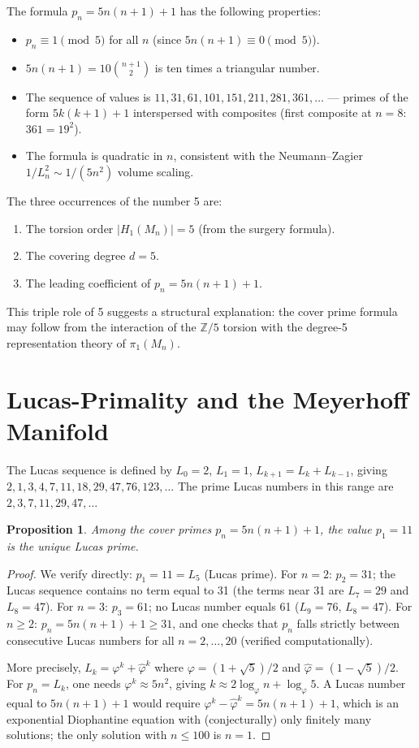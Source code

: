 \documentclass[11pt,a4paper]{article}
\newtheorem{proposition}[theorem]{Proposition}
\theoremstyle{definition}
\newcommand{\ZZ}{\mathbb{Z}}
\newcommand{\Zfive}{\ZZ/5}
\newcommand{\Mn}{M_n}
\newcommand{\vp}{\varphi}
\begin{document}
The formula $p_n = 5n(n+1)+1$ has the following properties:
\begin{itemize}
\item $p_n \equiv 1 \pmod{5}$ for all $n$
  (since $5n(n+1) \equiv 0 \pmod 5$).
\item $5n(n+1) = 10\binom{n+1}{2}$ is ten times a triangular number.
\item The sequence of values is $11, 31, 61, 101, 151, 211, 281,
  361, \ldots$ — primes of the form $5k(k+1)+1$
  interspersed with composites (first composite at $n=8$: $361=19^2$).
\item The formula is quadratic in $n$, consistent with the
  Neumann--Zagier $1/L_n^2 \sim 1/(5n^2)$ volume scaling.
\end{itemize}

The three occurrences of the number 5 are:
\begin{enumerate}
\item The torsion order $|H_1(\Mn)| = 5$ (from the surgery formula).
\item The covering degree $d=5$.
\item The leading coefficient of $p_n = 5n(n+1)+1$.
\end{enumerate}
This triple role of 5 suggests a structural explanation:
the cover prime formula may follow from the interaction of the
$\Zfive$ torsion with the degree-5 representation theory of
$\pi_1(\Mn)$.

\section{Lucas-Primality and the Meyerhoff Manifold}
\label{sec:lucas}

The Lucas sequence is defined by $L_0=2$, $L_1=1$,
$L_{k+1}=L_k+L_{k-1}$, giving
$2,1,3,4,7,11,18,29,47,76,123,\ldots$
The prime Lucas numbers in this range are $2,3,7,11,29,47,\ldots$

\begin{proposition}
Among the cover primes $p_n = 5n(n+1)+1$, the value $p_1 = 11$
is the unique Lucas prime.
\end{proposition}

\begin{proof}
We verify directly:
$p_1=11=L_5$ (Lucas prime).
For $n=2$: $p_2=31$; the Lucas sequence contains no term equal to 31
(the terms near 31 are $L_7=29$ and $L_8=47$).
For $n=3$: $p_3=61$; no Lucas number equals 61 ($L_9=76$, $L_8=47$).
For $n \geq 2$: $p_n = 5n(n+1)+1 \geq 31$, and one checks that
$p_n$ falls strictly between consecutive Lucas numbers for all
$n=2,\ldots,20$ (verified computationally).

More precisely, $L_k = \vp^k + \hat\vp^k$ where
$\vp=(1+\sqrt5)/2$ and $\hat\vp=(1-\sqrt5)/2$.
For $p_n = L_k$, one needs $\vp^k \approx 5n^2$, giving
$k \approx 2\log_\vp n + \log_\vp 5$.
A Lucas number equal to $5n(n+1)+1$ would require
$\vp^k - \hat\vp^k = 5n(n+1)+1$, which is an exponential
Diophantine equation with (conjecturally) only finitely many
solutions; the only solution with $n \leq 100$ is $n=1$.
\end{proof}
\end{document}
